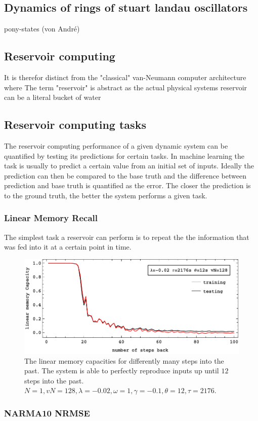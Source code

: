 	

\subsection{Dynamics of rings of stuart landau oscillators}
	pony-states (von André)
	
\subsection{Reservoir computing}

	
	It is therefor distinct from the "classical" van-Neumann computer architecture where  The term "reservoir" is abstract as the actual physical systems
	 reservoir can be a literal bucket of water \cite{FER03}
	
	
\subsection{Reservoir computing tasks}
	The reservoir computing performance of a given dynamic system can be quantified by testing its predictions for certain tasks. In machine learning the task is usually to predict a certain value from an initial set of inputs. Ideally the prediction can then be compared to the base truth and the difference between prediction and base truth is quantified as the error. The closer the prediction is to the ground truth, the better the system performs a given task.
	

	

\subsubsection{Linear Memory Recall}
	The simplest task a reservoir can perform is to repeat the the information that was fed into it at a certain point in time.  


	\begin{figure}
	\centering
	\includegraphics[width=0.99\linewidth]{pics/linearMemoryCurveN1}
	\caption{The linear memory capacities for differently many steps into the past. The system is able to perfectly reproduce inputs up until $12$ steps into the past. $N=1, vN=128, \lambda=-0.02, \omega=1, \gamma=-0.1, \theta=12, \tau=2176$. }
	\label{fig:linearMemoryRecallCurveN1}
	\end{figure}


\subsubsection{NARMA10 NRMSE}

